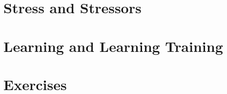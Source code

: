 \documentclass[makeidx]{book}
\begin{document}
\doparttoc
\frontmatter



%

\mainmatter
\part{Stress and Stressors}
\parttoc


\part{Learning and Learning Training}

\parttoc




% 

\part{Exercises}


{}

\backmatter
\printindex
\end{document}
